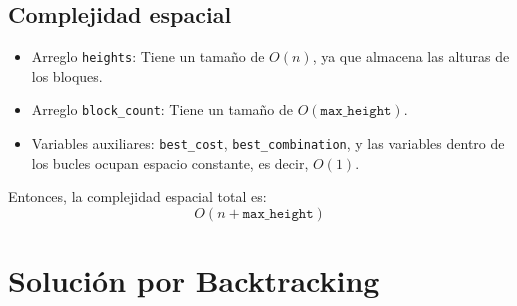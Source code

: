 \documentclass[a4paper,12pt]{article}
\begin{document}
\subsection{Complejidad espacial}
\begin{itemize}
	\item Arreglo \texttt{heights}: Tiene un tamaño de \(O(n)\), ya que almacena las alturas de los bloques.
	\item Arreglo \texttt{block\_count}: Tiene un tamaño de \(O(\texttt{max\_height})\).
	\item Variables auxiliares: \texttt{best\_cost}, \texttt{best\_combination}, y las variables dentro de los bucles ocupan espacio constante, es decir, \(O(1)\).
\end{itemize}

Entonces, la complejidad espacial total es:
\[
O(n + \texttt{max\_height})
\]


\section{Solución por Backtracking}
\end{document}
